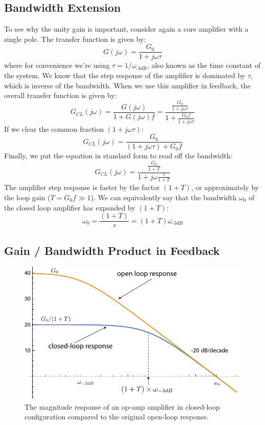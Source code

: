 \subsection{Bandwidth Extension}

To see why the unity gain is important, consider again a core amplifier with a single pole.  The transfer function is given by:
%
\begin{equation}
	G(j\omega ) = \frac{{{G_0}}}{{1 + j\omega \tau }}
\end{equation}
%
where for convenience we're using $\tau = 1/\omega_{\text{-3dB}}$, also known as the time constant of the system.  We know that the step response of the amplifier is dominated by $\tau$, which is inverse of the bandwidth.  When we use this amplifier in feedback, the overall transfer function is given by:
%
\begin{equation}
	G_{CL} (j\omega ) = \frac{G(j\omega )}
							{1 +G(j\omega )f }
 = \frac{\frac{{{G_0}}}{{1 + j\omega \tau }}}
							{1 +\frac{{{G_0 f}}}{{1 + j\omega \tau }} }
\end{equation}
%
If we clear the common fraction $(1 + j\omega \tau)$:
%
\begin{equation}
	G_{CL} (j\omega ) = \frac{G_0}
							{(1 + j\omega \tau) + G_0 f  }
\end{equation}
%
Finally, we put the equation in standard form to read off the bandwidth:
%
\begin{equation}
	G_{CL} (j\omega ) = \frac{\frac{G_0}{1 + T}}
							{1 + j\omega \frac{\tau}{1+T}  }
\end{equation}
%
The amplifier step response is faster by the factor $(1+T)$, or approximately by the loop gain ($T = G_0 f \gg 1$).  We can equivalently say that the bandwidth $\omega_0$ of the closed loop amplifier has expanded by $(1+T)$:
\begin{equation}
	\omega_0 = \frac{(1+T)}{\tau} = (1 + T) \omega_{\text{-3dB}}
\end{equation}


\subsection{Gain / Bandwidth Product in Feedback}

\begin{figure}[tb]
\begin{center}
\includegraphics[width=.7\columnwidth]{mag1pole_fb}
\end{center}
\caption{The magnitude response of an op-amp amplifier in closed-loop configuration compared to the original open-loop response.} \label{fig:mag1pole_fb}
\end{figure}

